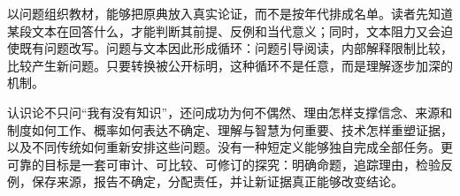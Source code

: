 以问题组织教材，能够把原典放入真实论证，而不是按年代排成名单。读者先知道某段文本在回答什么，才能判断其前提、反例和当代意义；同时，文本阻力又会迫使既有问题改写。问题与文本因此形成循环：问题引导阅读，内部解释限制比较，比较产生新问题。只要转换被公开标明，这种循环不是任意，而是理解逐步加深的机制。

认识论不只问“我有没有知识”，还问成功为何不偶然、理由怎样支撑信念、来源和制度如何工作、概率如何表达不确定、理解与智慧为何重要、技术怎样重塑证据，以及不同传统如何重新安排这些问题。没有一种短定义能够独自完成全部任务。更可靠的目标是一套可审计、可比较、可修订的探究：明确命题，追踪理由，检验反例，保存来源，报告不确定，分配责任，并让新证据真正能够改变结论。
